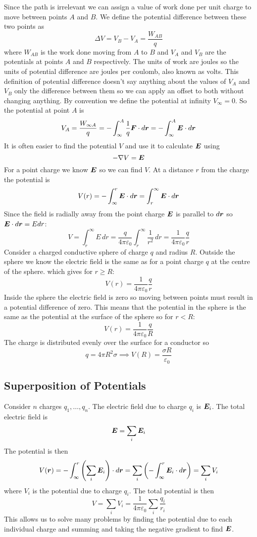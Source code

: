 \documentclass{article}
\begin{document}
    Since the path is irrelevant we can assign a value of work done per unit charge to move between points \(A\) and \(B\).
    We define the potential difference between these two points as
    \[\Delta V = V_B - V_A = \frac{W_{AB}}{q}\]
    where \(W_{AB}\) is the work done moving from \(A\) to \(B\) and \(V_A\) and \(V_B\) are the potentials at points \(A\) and \(B\) respectively.
    The units of work are joules so the units of potential difference are joules per coulomb, also known as volts.
    This definition of potential difference doesn't say anything about the values of \(V_A\) and \(V_B\) only the difference between them so we can apply an offset to both without changing anything.
    By convention we define the potential at infinity \(V_\infty = 0\).
    So the potential at point \(A\) is
    \[V_A = \frac{W_{\infty A}}{q} = - \int_{\infty}^A\frac{1}{q}\bm{F}\cdot d\bm{r} = -\int_\infty^A\bm{E}\cdot d\bm{r}\]
    It is often easier to find the potential \(V\) and use it to calculate \(\bm{E}\) using
    \[-\nabla V = \bm{E}\]
    For a point charge we know \(\bm{E}\) so we can find \(V\).
    At a distance \(r\) from the charge the potential is
    \[V(r) = -\int_\infty^r\bm{E}\cdot d\bm{r} = \int_r^\infty \bm{E}\cdot d\bm{r}\]
    Since the field is radially away from the point charge \(\bm{E}\) is parallel to \(d\bm{r}\) so \(\bm{E}\cdot d\bm{r} = Edr\):
    \[V = \int_r^\infty E\,dr = \frac{q}{4\pi\varepsilon_0}\int_r^\infty\frac{1}{r^2}\,dr = \frac{1}{4\pi\varepsilon_0}\frac{q}{r}\]
    Consider a charged conductive sphere of charge \(q\) and radius \(R\).
    Outside the sphere we know the electric field is the same as for a point charge \(q\) at the centre of the sphere.
    which gives for \(r \ge R\):
    \[V(r) = \frac{1}{4\pi\varepsilon_0}\frac{q}{r}\]
    Inside the sphere the electric field is zero so moving between points must result in a potential difference of zero.
    This means that the potential in the sphere is the same as the potential at the surface of the sphere so for \(r < R\):
    \[V(r) = \frac{1}{4\pi\varepsilon_0}\frac{q}{R}\]
    The charge is distributed evenly over the surface for a conductor so
    \[q = 4\pi R^2\sigma \implies V(R) = \frac{\sigma R}{\varepsilon_0}\]
    
    \subsection{Superposition of Potentials}
    Consider \(n\) charges \(q_1,\dotsc,q_n\).
    The electric field due to charge \(q_i\) is \(\bm{E}_i\).
    The total electric field is
    \[\bm{E} = \sum_i \bm{E}_i\]
    The potential is then
    \[V(\bm{r}) = -\int_\infty^r\left(\sum_i \bm{E}_i\right)\cdot d\bm{r} = \sum_i\left(-\int_\infty^r \bm{E}_i\cdot d\bm{r}\right) = \sum_i V_i\]
    where \(V_i\) is the potential due to charge \(q_i\).
    The total potential is then
    \[V = \sum_i V_i = \frac{1}{4\pi\varepsilon_0}\sum_i\frac{q_i}{r_i}\]
    This allows us to solve many problems by finding the potential due to each individual charge and summing and taking the negative gradient to find \(\bm{E}\).
    
\end{document}
